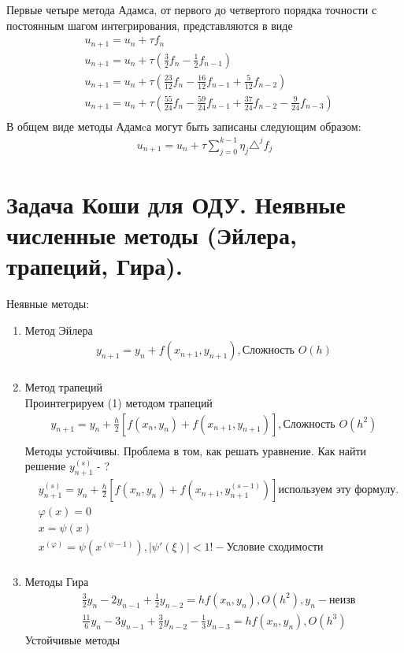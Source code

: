 \documentclass[12pt,a4paper]{article}
\begin{document}
	Первые четыре метода Адамса, от первого до четвертого порядка точности с постоянным шагом интегрирования, представляются в виде\\
	\begin{align*}
	&u_{n+1} = u_n + \tau f_n\\
	&u_{n+1} = u_n + \tau (\frac{3}{2}f_n - \frac{1}{2}f_{n-1})\\
	&u_{n+1} = u_n + \tau (\frac{23}{12}f_n - \frac{16}{12}f_{n-1} + \frac{5}{12}f_{n-2})\\
	&u_{n+1} = u_n + \tau (\frac{55}{24}f_n - \frac{59}{24}f_{n-1} + \frac{37}{24}f_{n-2} - \frac{9}{24}f_{n-3})\\
	\end{align*}
	В общем виде методы Адамcа могут быть записаны следующим образом:\\
	\begin{align*}
	u_{n+1} = u_n + \tau \sum_{j=0}^{k-1}\eta_j \triangle^j f_j
	\end{align*}
	\section{Задача Коши для ОДУ. Неявные численные методы (Эйлера, трапеций,  Гира). }
	Неявные методы:\\
	\begin{enumerate}
		\item Метод Эйлера 
		\begin{align*}
		y_{n+1} = y_n + f(x_{n+1}, y_{n+1}) , \text{Сложность } O(h)\\
		\end{align*}
		\item Метод трапеций\\
		Проинтегрируем (1) методом трапеций
		\begin{align*}
		y_{n+1} = y_n + \frac{h}{2}\left[ f(x_n, y_n) + f(x_{n+1}, y_{n+1})\right] , \text{Сложность } O(h^2)\\
		\end{align*}
		Методы устойчивы. Проблема в том, как решать уравнение. Как найти решение $y^{(s)}_{n+1}$ - ?\\
		\begin{align*}
		&y^{(s)}_{n+1} = y_n + \frac{h}{2}\left[f(x_n, y_n) + f(x_{n+1}, y^{(s-1)}_{n+1})\right] \text{используем эту формулу.}\\
		&\varphi(x) = 0\\
		&x = \psi(x)\\
		&x^{(\varphi)} = \psi(x^{(\psi-1)}), |\psi'(\xi)| < 1 ! - \text{Условие сходимости}\\
		\end{align*} 
		\item Методы Гира\\
		\begin{align*}
		&\frac{3}{2}y_n - 2y_{n-1} + \frac{1}{2}y_{n-2} = hf(x_n, y_n) , O(h^2), y_n - \text{неизв}		\\		
		&\frac{11}{6}y_n - 3y_{n-1} + \frac{3}{2}y_{n-2} - \frac{1}{3}y_{n-3} = hf(x_n, y_n), O(h^3)
		\end{align*}
		Устойчивые методы
	\end{enumerate}
\end{document}
